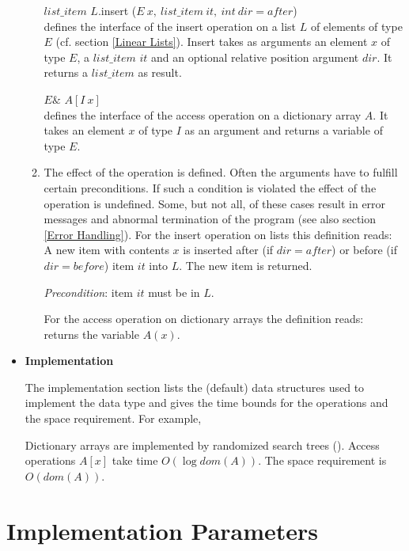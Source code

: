 \begin{itemize}
\begin{enumerate}
\smallskip
$list\_item$ $L$.insert ($E\ x,\ list\_item\ it,\ int\ dir=after$)\\
defines the interface of the insert operation on a list $L$ of elements of type
$E$ (cf. section \ref{Linear Lists}). Insert takes as arguments an element $x$ 
of type $E$, 
a $list\_item$ $it$ and an optional relative position argument $dir$. It returns 
a $list\_item$ as result.  

\smallskip
$E\&$  $A[I\ x]$\\
defines the interface of the access operation on a dictionary array $A$. It 
takes an element $x$ of type $I$ as an argument and returns a variable of type $E$.

\item  
{The effect of the operation is defined.  Often the arguments have to 
fulfill certain preconditions. If such a condition is violated the effect 
of the operation is undefined. Some, but not all, of these cases result 
in error messages and abnormal termination of the program (see also 
section \ref{Error Handling}). For the insert operation on lists this 
definition reads:\\
A new item with contents $x$ is inserted after (if $dir=after$) or before 
(if $dir=before$) item $it$ into $L$. The new item is returned.

{\it Precondition}: item $it$ must be in $L$.}

{For the access operation on dictionary arrays the definition reads:\\
returns the variable $A(x)$.
}
\end{enumerate}

\item {\bf  Implementation}

\smallskip
The implementation section lists the (default) data structures used to 
implement the data type and gives the time bounds for the operations and 
the space requirement. For example,

Dictionary arrays are implemented by randomized search trees (\cite{AS89}). 
Access operations $A[x]$ take time $O(\log dom(A))$.
The space requirement is $O(dom(A))$.
\end{itemize}

\section{Implementation Parameters}
   
